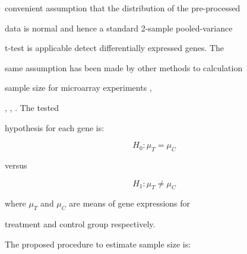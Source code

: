 \documentclass[12pt]{article}
\begin{document}
convenient assumption that the distribution of the pre-processed

data is normal and hence a standard 2-sample pooled-variance

t-test is applicable detect differentially expressed genes. The

same assumption has been made by other methods to calculation

sample size for microarray experiments \citep{Yang03},

\citep{Liu05}, \citep{Dobbin05}, \citep{Pawitan05}. The tested

hypothesis for each gene is:



\begin{equation}

  H_0: \mu_{T} = \mu_{C}  \nonumber

\end{equation}



versus

\begin{equation}

  H_1: \mu_{T} \neq \mu_{C} \nonumber

\end{equation}


where $\mu_{T}$ and $\mu_{C}$ are means of gene expressions for

treatment and control group respectively.



The proposed procedure to estimate sample size is:
\end{document}
